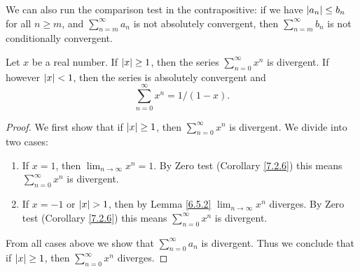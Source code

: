 \begin{note}
We can also run the comparison test in the contrapositive:
if we have \(\abs*{a_n} \leq b_n\) for all \(n \geq m\), and \(\sum_{n = m}^\infty a_n\) is not absolutely convergent, then \(\sum_{n = m}^\infty b_n\) is not conditionally convergent.
\end{note}

\begin{lemma}\label{7.3.3}
Let \(x\) be a real number.
If \(\abs*{x} \geq 1\), then the series \(\sum_{n = 0}^\infty x^n\) is divergent.
If however \(\abs*{x} < 1\), then the series is absolutely convergent and
\[
    \sum_{n = 0}^\infty x^n = 1 / (1 - x).
\]
\end{lemma}

\begin{proof}
We first show that if \(\abs*{x} \geq 1\), then \(\sum_{n = 0}^\infty x^n\) is divergent.
We divide into two cases:
\begin{enumerate}
    \item If \(x = 1\), then \(\lim_{n \to \infty} x^n = 1\). By Zero test (Corollary \ref{7.2.6}) this means \(\sum_{n = 0}^\infty x^n\) is divergent.
    \item If \(x = -1\) or \(\abs*{x} > 1\), then by Lemma \ref{6.5.2} \(\lim_{n \to \infty} x^n\) diverges.
    By Zero test (Corollary \ref{7.2.6}) this means \(\sum_{n = 0}^\infty x^n\) is divergent.
\end{enumerate}
From all cases above we show that \(\sum_{n = 0}^\infty a_n\) is divergent.
Thus we conclude that if \(\abs*{x} \geq 1\), then \(\sum_{n = 0}^\infty x^n\) diverges.


\end{proof}
